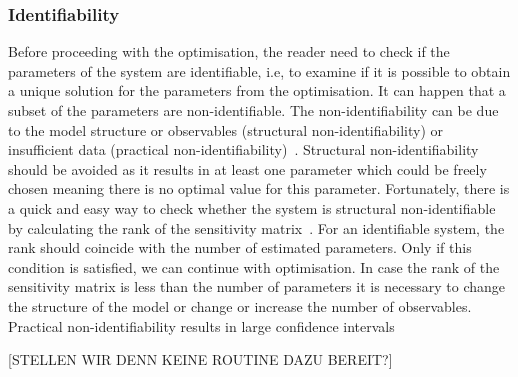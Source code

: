 \documentclass[10pt,A4paper]{article}
\begin{document}
\subsubsection*{Identifiability}
Before proceeding with the optimisation, the reader need to check if the parameters of the system are identifiable, i.e, to examine if it is possible to obtain a unique solution for the parameters from the optimisation.
It can happen that a subset of the parameters are non-identifiable.
The non-identifiability can be due to the model structure or observables (structural non-identifiability) or insufficient data (practical non-identifiability)~\cite{guillaume_introductory_2019, wieland_structural_2021, walter_identifiability_1996}.
Structural non-identifiability should be avoided as it results in at least one parameter which could be freely chosen meaning there is no optimal value for this parameter.
Fortunately, there is a quick and easy way to check whether the system is structural non-identifiable by calculating the rank of the sensitivity matrix~\cite{miao_identifiability_2011, stigter_fast_2015}.
For an identifiable system, the rank should coincide with the number of estimated parameters.
Only if this condition is satisfied, we can continue with optimisation.
In case the rank of the sensitivity matrix is less than the number of parameters it is necessary to change the structure of the model or change or increase the number of observables.
Practical non-identifiability results in large confidence intervals~\cite{holmberg_practical_1982, miao_identifiability_2011, wieland_structural_2021, kreutzProfileLikelihood2013} \newline

[STELLEN WIR DENN KEINE ROUTINE DAZU BEREIT?]
%
\end{document}
